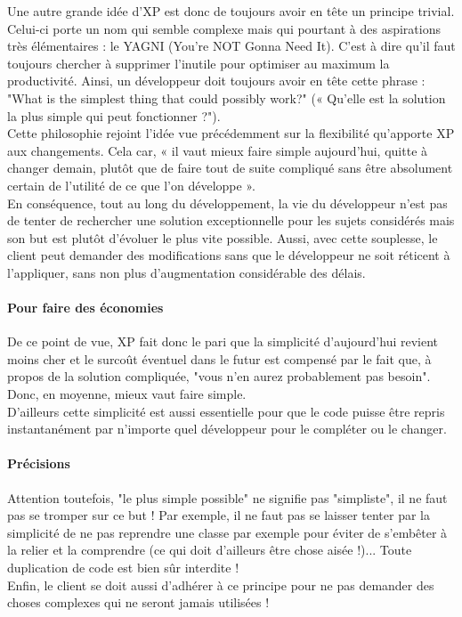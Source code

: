 \documentclass[]{article}
\let\oldparagraph\paragraph
\renewcommand{\paragraph}[1]{\oldparagraph{#1}\mbox{}}
\begin{document}
Une autre grande idée d'XP est donc de toujours avoir en tête un
principe trivial. Celui-ci porte un nom qui semble complexe mais qui
pourtant à des aspirations très élémentaires : le YAGNI (You're NOT
Gonna Need It). C'est à dire qu'il faut toujours chercher à supprimer
l'inutile pour optimiser au maximum la productivité. Ainsi, un
développeur doit toujours avoir en tête cette phrase : "What is the
simplest thing that could possibly work?" (« Qu'elle est la solution la
plus simple qui peut fonctionner ?").\\
Cette philosophie rejoint l'idée vue précédemment sur la flexibilité
qu'apporte XP aux changements. Cela car, « il vaut mieux faire simple
aujourd'hui, quitte à changer demain, plutôt que de faire tout de suite
compliqué sans être absolument certain de l'utilité de ce que l'on
développe ».\\
En conséquence, tout au long du développement, la vie du développeur
n'est pas de tenter de rechercher une solution exceptionnelle pour les
sujets considérés mais son but est plutôt d'évoluer le plus vite
possible. Aussi, avec cette souplesse, le client peut demander des
modifications sans que le développeur ne soit réticent à l'appliquer,
sans non plus d'augmentation considérable des délais.


\hypertarget{pour-faire-des-uxe9conomies}{%
\paragraph{Pour faire des économies}\label{pour-faire-des-uxe9conomies}}

De ce point de vue, XP fait donc le pari que la simplicité d'aujourd'hui
revient moins cher et le surcoût éventuel dans le futur est compensé par
le fait que, à propos de la solution compliquée, "vous n'en aurez
probablement pas besoin". Donc, en moyenne, mieux vaut faire simple.\\
D'ailleurs cette simplicité est aussi essentielle pour que le code
puisse être repris instantanément par n'importe quel développeur pour le
compléter ou le changer.


\hypertarget{pruxe9cisions}{%
\paragraph{Précisions}\label{pruxe9cisions}}

Attention toutefois, "le plus simple possible" ne signifie pas
"simpliste", il ne faut pas se tromper sur ce but ! Par exemple, il ne
faut pas se laisser tenter par la simplicité de ne pas reprendre une
classe par exemple pour éviter de s'embêter à la relier et la comprendre
(ce qui doit d'ailleurs être chose aisée !)... Toute duplication de code
est bien sûr interdite !\\
Enfin, le client se doit aussi d'adhérer à ce principe pour ne pas
demander des choses complexes qui ne seront jamais utilisées !
\end{document}
